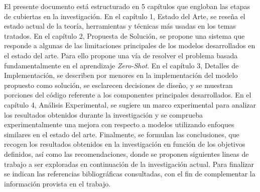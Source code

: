 El presente documento está estructurado en 5 capítulos que engloban las etapas de cubiertas en la investigación. En el capítulo 1, Estado del Arte, se reseña el estado actual de la teoría, herramientas y técnicas más usadas en los temas tratados. En el capítulo 2, Propuesta de Solución, se propone una sistema que responde a algunas de las limitaciones principales de los modelos desarrollados en el estado del arte. Para ello propone una vía de resolver el problema basada fundamentalmente en el aprendizaje \textit{Zero-Shot}. En el capítulo 3, Detalles de Implementación, se describen por menores en la implementación del modelo propuesto como solución, se esclarecen decisiones de diseño, y se muestran porciones del código referente a los componentes principales desarrollados. En el capítulo 4, Análisis Experimental, se sugiere un marco experimental para analizar los resultados obtenidos durante la investigación y se comprueba experimentalmente una mejora con respecto a modelos utilizando enfoques similares en el estado del arte. Finalmente, se formulan las conclusiones, que recogen los resultados obtenidos en la investigación en función de los objetivos definidos, así como las recomendaciones, donde se proponen siguientes lineas de trabajo a ser exploradas en continuación de la investigación actual. Para finalizar se indican las referencias bibliográficas consultadas, con el fin de complementar la información provista en el trabajo.



